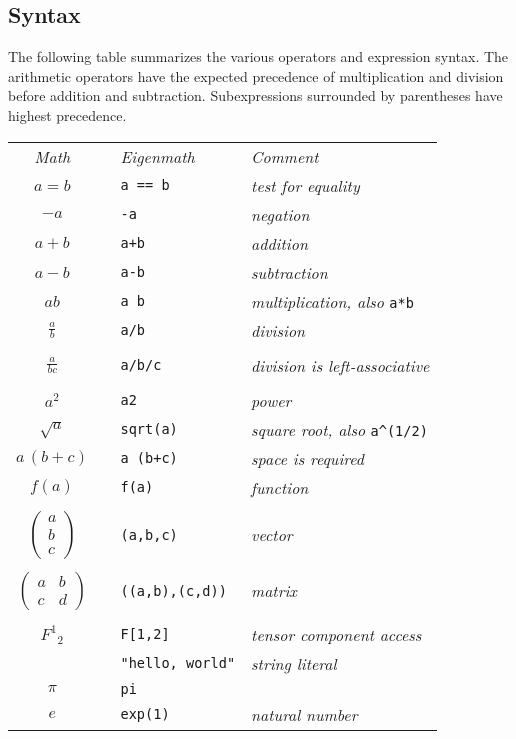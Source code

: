 \subsection{Syntax}
The following table summarizes the various operators and expression syntax.
The arithmetic operators have the expected precedence of
multiplication and division before addition and subtraction.
Subexpressions surrounded by parentheses have highest precedence.

\begin{center}
\begin{tabular}{clll}
{\it Math} & & {\it Eigenmath} & {\it Comment}
\\[1ex]
$a=b$ & & \verb$a == b$ & {\it test for equality}
\\[1ex]
$-a$ & & {\tt -a} & {\it negation}
\\[1ex]
$a+b$ & & {\tt a+b} & {\it addition}
\\[1ex]
$a-b$ & & {\tt a-b} & {\it subtraction}
\\[1ex]
$ab$ & & {\tt a b} & {\it multiplication, also} \verb$a*b$
\\[1ex]
$\displaystyle\frac{a}{b}$ & & {\tt a/b} & {\it division}
\\
\\
$\displaystyle\frac{a}{bc}$ & & {\tt a/b/c} & {\it division is left-associative}
\\
\\
$a^2$ & & {\tt a{\char94}2} & {\it power}
\\[1ex]
$\sqrt{a}$ & & \verb$sqrt(a)$ & {\it square root, also} \verb$a^(1/2)$
\\[1ex]
$a\,(b+c)$ & & {\tt a (b+c)} & {\it space is required}
\\[1ex]
$f(a)$ & & {\tt f(a)} & {\it function}
\\
\\
$\begin{pmatrix}a\\ b\\ c\end{pmatrix}$ & & {\tt (a,b,c)} & {\it vector}
\\
\\
$\begin{pmatrix}a&b\\ c&d\end{pmatrix}$ & & {\tt ((a,b),(c,d))} & {\it matrix}
\\\\
$F^1{}_2$ & & {\tt F[1,2]} & {\it tensor component access}
\\[1ex]
 & & \verb$"hello, world"$ & {\it string literal}
\\[1ex]
$\pi$ & & {\tt pi} &
\\[1ex]
$e$ && {\tt exp(1)} & {\it natural number}
\end{tabular}
\end{center}
